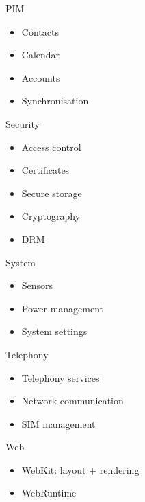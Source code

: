 \documentclass[presentation,aspectratio=43,12pt]{beamer}
\begin{document}
\begin{frame}[label=sec-3-10]{PIM}
\begin{itemize}
\item Contacts
\item Calendar
\item Accounts
\item Synchronisation
\end{itemize}
\end{frame}
\begin{frame}[label=sec-3-11]{Security}
\begin{itemize}
\item Access control
\item Certificates
\item Secure storage
\item Cryptography
\item DRM
\end{itemize}

\end{frame}
\begin{frame}[label=sec-3-12]{System}
\begin{itemize}
\item Sensors
\item Power management
\item System settings
\end{itemize}
\end{frame}
\begin{frame}[label=sec-3-13]{Telephony}
\begin{itemize}
\item Telephony services
\item Network communication
\item SIM management
\end{itemize}
\end{frame}
\begin{frame}[label=sec-3-14]{Web}
\begin{itemize}
\item WebKit: layout + rendering
\item WebRuntime
\end{itemize}

\end{frame}
\end{document}
